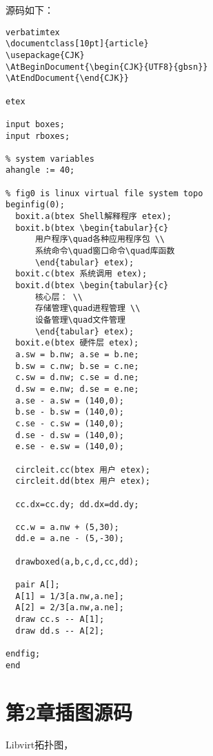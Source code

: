 \noindent 源码如下：
\begin{verbatim}
verbatimtex
\documentclass[10pt]{article}
\usepackage{CJK}
\AtBeginDocument{\begin{CJK}{UTF8}{gbsn}}
\AtEndDocument{\end{CJK}}

etex
  
input boxes;
input rboxes;

% system variables
ahangle := 40;

% fig0 is linux virtual file system topo
beginfig(0);
  boxit.a(btex Shell解释程序 etex);
  boxit.b(btex \begin{tabular}{c}
      用户程序\quad各种应用程序包 \\
      系统命令\quad窗口命令\quad库函数
      \end{tabular} etex);
  boxit.c(btex 系统调用 etex);
  boxit.d(btex \begin{tabular}{c}
      核心层： \\
      存储管理\quad进程管理 \\
      设备管理\quad文件管理
      \end{tabular} etex);
  boxit.e(btex 硬件层 etex);
  a.sw = b.nw; a.se = b.ne;
  b.sw = c.nw; b.se = c.ne;
  c.sw = d.nw; c.se = d.ne;
  d.sw = e.nw; d.se = e.ne;
  a.se - a.sw = (140,0);
  b.se - b.sw = (140,0);
  c.se - c.sw = (140,0);
  d.se - d.sw = (140,0);
  e.se - e.sw = (140,0);

  circleit.cc(btex 用户 etex);
  circleit.dd(btex 用户 etex);

  cc.dx=cc.dy; dd.dx=dd.dy;

  cc.w = a.nw + (5,30);
  dd.e = a.ne - (5,-30);
  
  drawboxed(a,b,c,d,cc,dd);

  pair A[];
  A[1] = 1/3[a.nw,a.ne];
  A[2] = 2/3[a.nw,a.ne];
  draw cc.s -- A[1];
  draw dd.s -- A[2];

endfig;
end
\end{verbatim}

\section{第2章插图源码}

Libvirt拓扑图，

